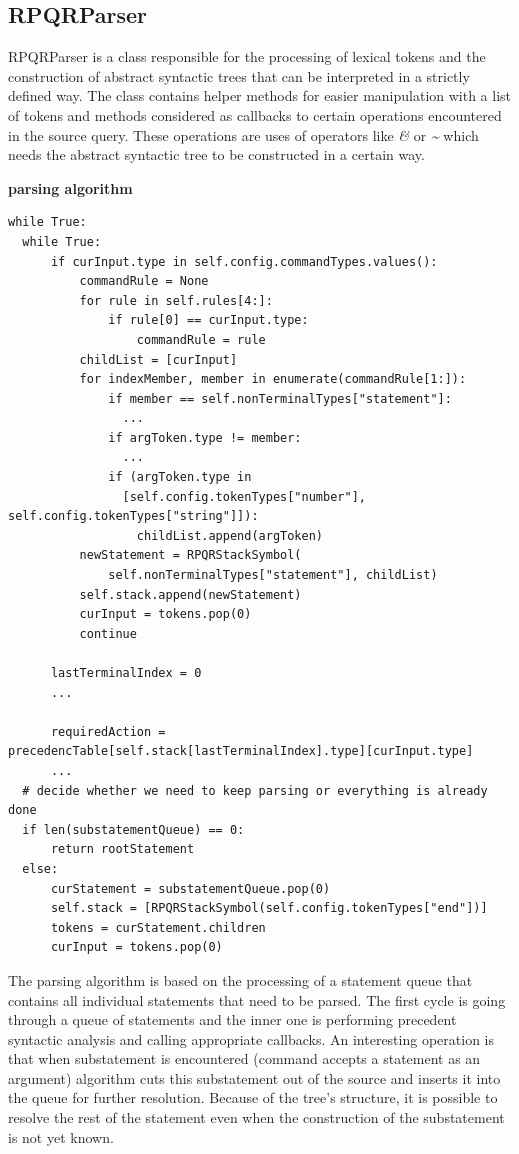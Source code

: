 \subsection*{RPQRParser}

RPQRParser is a class responsible for the processing of lexical tokens and the construction of abstract syntactic
trees that can be interpreted in a strictly defined way. The class contains helper methods for easier
manipulation with a list of tokens and methods considered as callbacks to certain operations encountered
in the source query. These operations are uses of operators like \textit{\&} or \textit{\textasciitilde}
which needs the abstract syntactic tree to be constructed in a certain way.

\textbf{parsing algorithm}

\begin{lstlisting}
while True:
  while True:
      if curInput.type in self.config.commandTypes.values():
          commandRule = None
          for rule in self.rules[4:]:
              if rule[0] == curInput.type:
                  commandRule = rule
          childList = [curInput]
          for indexMember, member in enumerate(commandRule[1:]):
              if member == self.nonTerminalTypes["statement"]:
                ...
              if argToken.type != member:
                ...
              if (argToken.type in
                [self.config.tokenTypes["number"], self.config.tokenTypes["string"]]):
                  childList.append(argToken)
          newStatement = RPQRStackSymbol(
              self.nonTerminalTypes["statement"], childList)
          self.stack.append(newStatement)
          curInput = tokens.pop(0)
          continue

      lastTerminalIndex = 0
      ...

      requiredAction = precedencTable[self.stack[lastTerminalIndex].type][curInput.type]
      ...
  # decide whether we need to keep parsing or everything is already done
  if len(substatementQueue) == 0:
      return rootStatement
  else:
      curStatement = substatementQueue.pop(0)
      self.stack = [RPQRStackSymbol(self.config.tokenTypes["end"])]
      tokens = curStatement.children
      curInput = tokens.pop(0)
\end{lstlisting}

The parsing algorithm is based on the processing of a statement queue that contains all individual statements
that need to be parsed. The first cycle is going through a queue of statements and the inner one is
performing precedent syntactic analysis and calling appropriate callbacks. An interesting operation is
that when substatement is encountered (command accepts a statement as an argument) algorithm cuts this
substatement out of the source and inserts it into the queue for further resolution. Because of the tree's structure, it is possible to resolve the rest of the statement even when the construction of the substatement is not yet
known.

